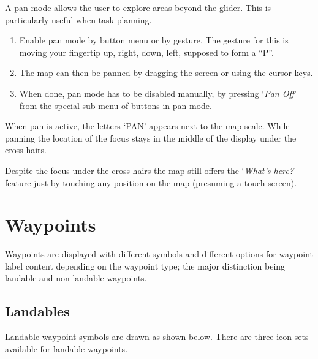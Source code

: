A pan mode allows the user to explore areas beyond the glider.  This
is particularly useful when task planning.
\begin{enumerate}
\item Enable pan mode by button menu or by gesture.  The gesture for this is moving your fingertip up, right, down, left, supposed to form a ``P''.
\item The map can then be panned by dragging the screen or using the cursor
  keys.
\item When done, pan mode has to be disabled manually, by pressing `\emph{Pan Off}' 
  from the special sub-menu of buttons in pan mode.
\end{enumerate} 

When pan is active, the letters `PAN' appears next to the map scale.  While
panning the location of the focus stays in the middle of the display under the
cross hairs. 

Despite the focus under the cross-hairs the map
still offers the `\emph{What's here?}' feature just by touching any 
position on the map (presuming a touch-screen).


\section{Waypoints}\label{sec:waypoint-schemes}
Waypoints are displayed with different symbols and different options for
waypoint label content depending on the
waypoint type; the major distinction being landable and non-landable
waypoints.

\subsection*{Landables}
Landable waypoint symbols are drawn as shown below. There are three icon sets
available for landable waypoints. 

